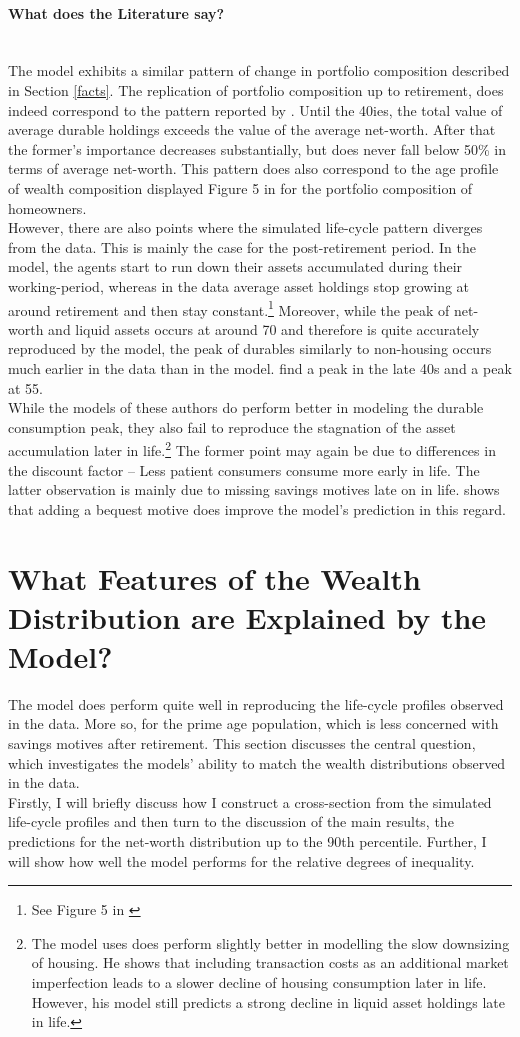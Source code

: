 \documentclass[a4paper,12pt,legno]{article}
\newcommand{\myparagraph}[1]{\paragraph{#1}\mbox{}\\}
\begin{document}
\myparagraph{What does the Literature say?} The model exhibits a similar pattern of change in portfolio composition described in Section \ref{facts}. The replication of portfolio composition up to retirement, does indeed correspond to the pattern reported by \cite{FV&K2011}. Until the 40ies, the total value of average durable holdings exceeds the value of the average net-worth. After that the former's importance decreases substantially, but does never fall below 50\% in terms of average net-worth. This pattern does also correspond to the age profile of wealth composition displayed Figure 5 in \cite{yang2009} for the portfolio composition of homeowners. \\ However, there are also points where the simulated life-cycle pattern diverges from the data. This is mainly the case for the post-retirement period. In the model, the agents start to run down their assets accumulated during their working-period, whereas in the data average asset holdings stop growing at around retirement and then stay constant.\footnote{See Figure 5 in \cite{yang2009}} Moreover, while the peak of net-worth and liquid assets occurs at around 70 and therefore is quite accurately reproduced by the model, the peak of durables similarly to non-housing occurs much earlier in the data than in the model. \cite{FV&K2011} find a peak in the late 40s and \cite{yang2009} a peak at 55. \\
While the models of these authors do perform better in modeling the durable consumption peak, they also fail to reproduce the stagnation of the asset accumulation later in life.\footnote{The model \cite{yang2009} uses does perform slightly better in modelling the slow downsizing of housing. He shows that including transaction costs as an additional market imperfection leads to a slower decline of housing consumption later in life. However, his model still predicts a strong decline in liquid asset holdings late in life.} The former point may again be due to differences in the discount factor \--- Less patient consumers consume more early in life. The latter observation is mainly due to missing savings motives late on in life. \cite{de2004wealth} shows that adding a bequest motive does improve the model's prediction in this regard. 

\section{What Features of the Wealth Distribution are Explained by the Model?}
\label{distribution_model}
The model does perform quite well in reproducing the life-cycle profiles observed in the data. More so, for the prime age population, which is less concerned with savings motives after retirement. This section discusses the central question, which investigates the models' ability to match the wealth distributions observed in the data.\\
Firstly, I will briefly discuss how I construct a cross-section from the simulated life-cycle profiles and then turn to the discussion of the main results, the predictions for the net-worth distribution up to the 90th percentile. Further, I will show how well the model performs for the relative degrees of inequality. 
\end{document}
